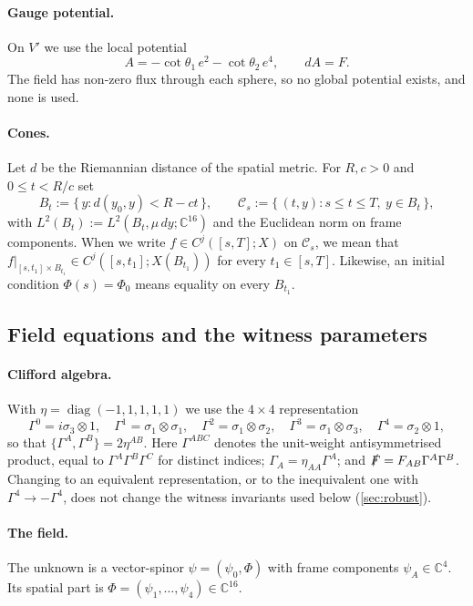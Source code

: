 \documentclass[11pt]{article}
\theoremstyle{plain}
\theoremstyle{definition}
\theoremstyle{remark}
\newcommand{\C}{\mathbb{C}}
\newcommand{\Ccal}{\mathcal{C}}
\begin{document}
\paragraph{Gauge potential.}
On $V'$ we use the local potential
\[
  A = -\cot\theta_1\, e^2 - \cot\theta_2\, e^4, \qquad dA = F .
\]
The field has non-zero flux through each sphere, so no global potential exists, and none is used.

\paragraph{Cones.}
Let $d$ be the Riemannian distance of the spatial metric. For $R, c > 0$ and $0 \le t < R/c$ set
\[
  B_t := \{\, y : d(y_0,y) < R - ct \,\}, \qquad
  \Ccal_s := \{\, (t,y) : s \le t \le T,\ y \in B_t \,\},
\]
with $L^2(B_t) := L^2(B_t, \mu\,dy;\C^{16})$ and the Euclidean norm on frame components. When we write $f \in C^j([s,T];X)$ on $\Ccal_s$, we mean that $f|_{[s,t_1]\times B_{t_1}} \in C^j([s,t_1];X(B_{t_1}))$ for every $t_1 \in [s,T]$. Likewise, an initial condition $\Phi(s) = \Phi_0$ means equality on every $B_{t_1}$.

\subsection{Field equations and the witness parameters}\label{sec:equations}

\paragraph{Clifford algebra.}
With $\eta = \operatorname{diag}(-1,1,1,1,1)$ we use the $4\times 4$ representation
\[
  \Gamma^0 = i\sigma_3\otimes 1,\quad
  \Gamma^1 = \sigma_1\otimes\sigma_1,\quad
  \Gamma^2 = \sigma_1\otimes\sigma_2,\quad
  \Gamma^3 = \sigma_1\otimes\sigma_3,\quad
  \Gamma^4 = \sigma_2\otimes 1,
\]
so that $\{\Gamma^A,\Gamma^B\} = 2\eta^{AB}$. Here $\Gamma^{ABC}$ denotes the unit-weight antisymmetrised product, equal to $\Gamma^A\Gamma^B\Gamma^C$ for distinct indices; $\Gamma_A = \eta_{AA}\Gamma^A$; and $\slashed{F} = F_{AB}\Gamma^A\Gamma^B$. Changing to an equivalent representation, or to the inequivalent one with $\Gamma^4 \to -\Gamma^4$, does not change the witness invariants used below (\cref{sec:robust}).

\paragraph{The field.}
The unknown is a vector-spinor $\psi = (\psi_0, \Phi)$ with frame components $\psi_A \in \C^4$. Its spatial part is $\Phi = (\psi_1,\dots,\psi_4) \in \C^{16}$.
\end{document}
